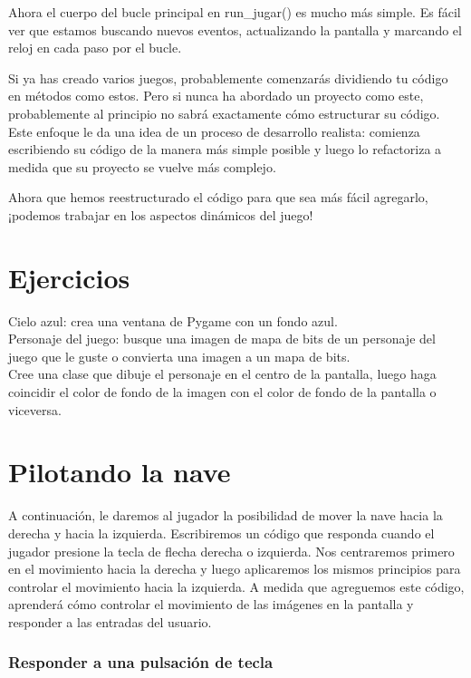 Ahora el cuerpo del bucle principal en {\ttfamily run\_jugar()} es mucho más simple. 
Es fácil ver que estamos buscando nuevos eventos, actualizando la pantalla y  marcando el reloj en cada paso por el bucle.

Si ya has creado varios juegos, probablemente comenzarás dividiendo tu código en métodos como estos. Pero si nunca ha abordado
un proyecto como este, probablemente al principio no sabrá exactamente cómo estructurar su código. Este enfoque le da una idea
de un proceso de desarrollo realista: comienza escribiendo su código de la manera más simple posible y luego lo refactoriza a
medida que su proyecto se vuelve más complejo.

Ahora que hemos reestructurado el código para que sea más fácil agregarlo, ¡podemos trabajar en los aspectos dinámicos del juego!

\section{Ejercicios}  %

Cielo azul: crea una ventana de Pygame con un fondo azul.\\


Personaje del juego: busque una imagen de mapa de bits de un personaje del juego que le guste o convierta una imagen
a un mapa de bits. \\

Cree una clase que dibuje el personaje en el centro de la pantalla, luego haga coincidir el color de fondo
de la imagen con el color de fondo de la pantalla o viceversa.

\section{Pilotando la nave}

A continuación, le daremos al jugador la posibilidad de mover la nave hacia la derecha y hacia la izquierda. 
Escribiremos un código que responda cuando el jugador presione la tecla de flecha derecha o izquierda. 
Nos centraremos primero en el movimiento  hacia la derecha y luego aplicaremos los mismos principios para controlar el 
movimiento hacia la izquierda. 
A medida que agreguemos este código, aprenderá cómo controlar el movimiento de las imágenes en la pantalla y responder a las entradas del usuario.

\subsubsection{Responder a una pulsación de tecla}

